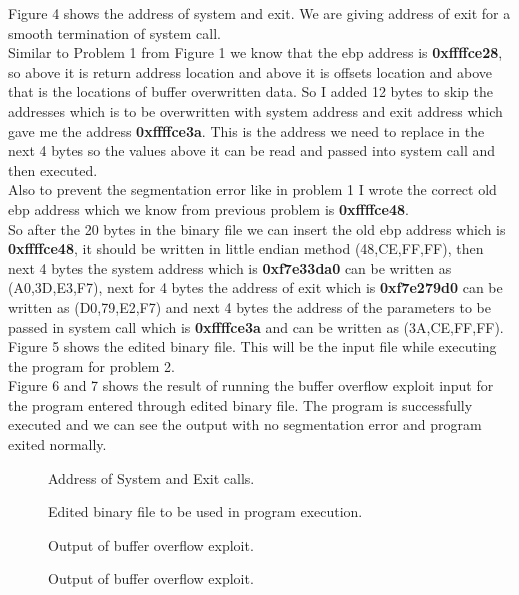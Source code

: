 \documentclass[a4paper, 11pt]{article}
\begin{document}
Figure 4 shows the address of system and exit. We are giving address of exit for a smooth termination of system call.\\

Similar to Problem 1 from Figure 1 we know that the ebp address is \textbf{0xffffce28}, so above it is return address location and above it is offsets location and above that is the locations of buffer overwritten data. So I added 12 bytes to skip the addresses which is to be overwritten with system address and exit address which gave me the address \textbf{0xffffce3a}. This is the address we need to replace in the next 4 bytes so the values above it can be read and passed into system call and then executed.\\

Also to prevent the segmentation error like in problem 1 I wrote the correct old ebp address which we know from previous problem is \textbf{0xffffce48}.\\

So after the 20 bytes in the binary file we can insert the old ebp address which is \textbf{0xffffce48}, it should be written in little endian method (48,CE,FF,FF), then next 4 bytes the system address which is \textbf{0xf7e33da0} can be written as (A0,3D,E3,F7), next for 4 bytes the address of exit which is \textbf{0xf7e279d0} can be written as (D0,79,E2,F7) and next 4 bytes the address of the parameters to be passed in system call which is \textbf{0xffffce3a} and can be written as (3A,CE,FF,FF). Figure 5 shows the edited binary file. This will be the input file while executing the program for problem 2.\\

Figure 6 and 7 shows the result of running the buffer overflow exploit input for the program entered through edited binary file. The program is successfully executed and we can see the output with no segmentation error and program exited normally.

\begin{figure}
	\caption{Address of System and Exit calls.}
\end{figure}

\begin{figure}
	\caption{Edited binary file to be used in program execution.}
\end{figure}

\begin{figure}
	\centering
	\caption{Output of buffer overflow exploit.}
\end{figure}

\begin{figure}
	\centering
	\caption{Output of buffer overflow exploit.}
\end{figure}
\end{document}
